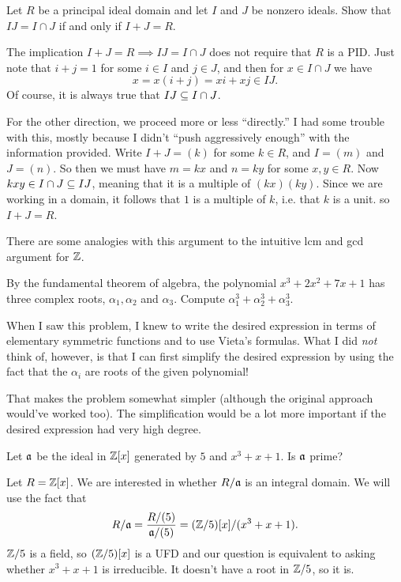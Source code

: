 \begin{problem}
	Let $R$ be a principal ideal domain and let $I$ and $J$ be nonzero ideals. Show that $IJ = I \cap J$ if and only if $I+J = R$.
\end{problem}
\begin{solution}
	The implication $I+J = R \implies IJ = I \cap J$ does not require that $R$ is a PID. Just note that $i+j = 1$ for some $i\in I$ and $j\in J$, and then for $x\in I\cap J$ we have
	\[
		x = x(i+j) = xi + xj \in IJ.
	\]
	Of course, it is always true that $IJ \subseteq I\cap J$.
	
	For the other direction, we proceed more or less ``directly.'' I had some trouble with this, mostly because I didn't ``push aggressively enough'' with the information provided. Write $I+J = (k)$ for some $k\in R$, and $I = (m)$ and $J = (n)$. So then we must have $m = kx$ and $n = ky$ for some $x,y \in R$. Now $kxy \in I \cap J \subseteq IJ$, meaning that it is a multiple of $(kx)(ky)$. Since we are working in a domain, it follows that $1$ is a multiple of $k$, i.e. that $k$ is a unit. so $I+J = R$.
	
	There are some analogies with this argument to the intuitive lcm and gcd argument for $\mathbb{Z}$.
\end{solution}

\begin{problem}
	By the fundamental theorem of algebra, the polynomial $x^3 + 2x^2 + 7x + 1$ has three complex roots, $\alpha_1, \alpha_2$ and $\alpha_3$. Compute $\alpha_1^3 + \alpha_2^3 + \alpha_3^3$.
\end{problem}
\begin{solution}
	When I saw this problem, I knew to write the desired expression in terms of elementary symmetric functions and to use Vieta's formulas. What I did \emph{not} think of, however, is that I can first simplify the desired expression by using the fact that the $\alpha_i$ are roots of the given polynomial!
	
	That makes the problem somewhat simpler (although the original approach would've worked too). The simplification would be a lot more important if the desired expression had very high degree.
\end{solution}

\begin{problem}
	Let $\mathfrak{a}$ be the ideal in $\mathbb{Z}[x]$ generated by $5$ and $x^3 + x + 1$. Is $\mathfrak{a}$ prime?
\end{problem}
\begin{solution}
	Let $R = \mathbb{Z}[x]$. We are interested in whether $R / \mathfrak{a}$ is an integral domain. We will use the fact that
	\[
		R/\mathfrak{a} = \frac{R/(5)}{\mathfrak{a}/(5)} = (\mathbb{Z}/5)[x]/(x^3 + x + 1).
	\]
	$\mathbb{Z}/5$ is a field, so $(\mathbb{Z}/5)[x]$ is a UFD and our question is equivalent to asking whether $x^3 + x + 1$ is irreducible. It doesn't have a root in $\mathbb{Z}/5$, so it is.
\end{solution}

